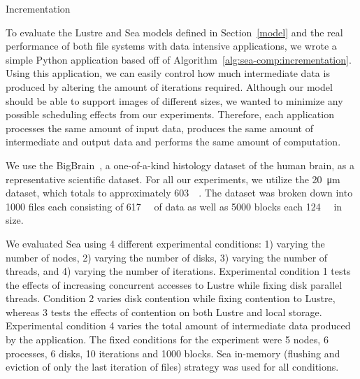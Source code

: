 \begin{algorithm2e}\caption{Incrementation}\label{alg:sea-comp:incrementation}
\SetAlgoLined {}
\end{algorithm2e}


      To evaluate the Lustre and Sea models defined in Section~\ref{model} and
      the real performance of both file systems with data intensive
      applications, we wrote a simple Python application based off of
      Algorithm~\ref{alg:sea-comp:incrementation}.          
      Using this application, we can easily control how much intermediate data
      is produced by altering the amount of iterations required. Although our
      model should be able to support images of different sizes, we wanted to
      minimize any possible scheduling effects from our experiments. Therefore,
      each application processes the same amount of input data, produces the
      same amount of intermediate and output data and performs the same amount
      of computation.
                                                                                   
      We use the BigBrain~\cite{amunts2013bigbrain}, a one-of-a-kind histology dataset of the 
      human brain, as a representative scientific dataset. For all our
      experiments, we utilize the \SI{20}{\micro\meter} dataset, which totals to
      approximately \SI{603}{\gibi\byte}. The dataset was broken down into 1000
      files each consisting of \SI{617}{\mebi\byte} of data as well as 5000 blocks each 
      \SI{124}{\mebi\byte} in size.
      
                                                                                   
      We evaluated Sea using 4 different experimental conditions: 1) varying the
      number of nodes, 2) varying the number of disks, 3) varying the number of
      threads, and 4) varying the number of iterations. Experimental condition 1 tests the effects of increasing concurrent
      accesses to Lustre while fixing disk parallel threads. Condition 2 varies
      disk contention while fixing contention to Lustre, whereas 3 tests the
      effects of contention on both Lustre and local storage. Experimental
      condition 4 varies the total amount of intermediate data produced by the
      application. The fixed conditions for
      the experiment were 5 nodes, 6 processes, 6 disks, 10 iterations and 1000 blocks.
      Sea in-memory (flushing and eviction of only the last iteration of files) strategy was used for all conditions.
      
